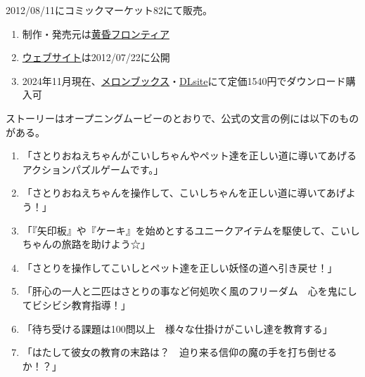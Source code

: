 

%




2012/08/11にコミックマーケット82にて販売。
\begin{enumerate}[label={\sarrow}]
\item 制作・発売元は\href{http://tasofro.net/}{黄昏フロンティア}
\item \href{http://tasofro.net/satori/}{ウェブサイト}は2012/07/22に公開
\item 2024年11月現在、\href{https://www.melonbooks.co.jp/detail/detail.php?product_id=967172}{メロンブックス}・\href{https://www.dlsite.com/home/work/=/product_id/RJ144848.html}{DLsite}にて定価1540円でダウンロード購入可
\end{enumerate}



ストーリーはオープニングムービーのとおりで、公式の文言の例には以下のものがある。
\begin{enumerate}[label={\sarrow}]
\item 「さとりおねえちゃんがこいしちゃんやペット達を正しい道に導いてあげるアクションパズルゲームです。」
\item 「さとりおねえちゃんを操作して、こいしちゃんを正しい道に導いてあげよう！」
\item 「『矢印板』や『ケーキ』を始めとするユニークアイテムを駆使して、こいしちゃんの旅路を助けよう☆」
\item 「さとりを操作してこいしとペット達を正しい妖怪の道へ引き戻せ！」
\item 「肝心の一人と二匹はさとりの事など何処吹く風のフリーダム　心を鬼にしてビシビシ教育指導！」
\item 「待ち受ける課題は100問以上　様々な仕掛けがこいし達を教育する」
\item 「はたして彼女の教育の末路は？　迫り来る信仰の魔の手を打ち倒せるか！？」
\end{enumerate}



